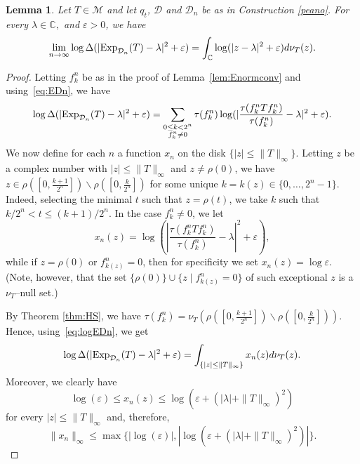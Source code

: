 \documentclass{amsart}
\theoremstyle{plain}
\newtheorem{lem}[thm]{Lemma}
\theoremstyle{remark}
\begin{document}
\begin{lem}\label{det convergence} Let $T\in\mathcal{M}$ and let $q_t$,  $\mathcal{D}$ and $\mathcal{D}_n$ be as in Construction \ref{peano}. For every $\lambda\in\mathbb{C},$ and $\varepsilon>0$, we have
\begin{equation}\label{eq:det convergence}
\lim_{n\to\infty}\log\Delta(|{\rm Exp}_{\mathcal{D}_n}(T)-\lambda|^2+\varepsilon)=\int_{\mathbb{C}}\log(|z-\lambda|^2+\varepsilon)d\nu_T(z).
\end{equation}
\end{lem}
\begin{proof} Letting $f^n_k$ be as in the proof of Lemma~\ref{lem:Enormconv} and using~\eqref{eq:EDn}, we have
\begin{equation}\label{eq:logEDn}
\log\Delta(|{\rm Exp}_{\mathcal{D}_n}(T)-\lambda|^2+\varepsilon)=\sum_{\substack{0\le k<2^n \\ f^n_k\ne0}}\tau(f^n_k)\log(|\frac{\tau(f^n_kTf^n_k)}{\tau(f^n_k)}-\lambda|^2+\varepsilon).
\end{equation}
We now define for each $n$ a function $x_n$ on the disk $\{|z|\le\|T\|_\infty\}$.
Letting $z$ be a complex number with 
$|z|\le\|T\|_\infty$ and $z\ne\rho(0)$, we have
$z\in\rho([0,\frac{k+1}{2^n}])\backslash \rho([0,\frac{k}{2^n}])$ for some unique $k=k(z)\in\{0,\ldots,2^n-1\}$.
Indeed, selecting the minimal $t$ such that $z=\rho(t)$, we take $k$ such that $k/2^n<t\leq(k+1)/2^n$.
In the case $f^n_k\ne0$, we let
\begin{equation}\label{xn def}
x_n(z)=\log(|\frac{\tau(f^n_kTf^n_k)}{\tau(f^n_k)}-\lambda|^2+\varepsilon), %
\end{equation}
while if $z=\rho(0)$ or $f^n_{k(z)}=0$, then for specificity we set $x_n(z)=\log\varepsilon$.
(Note, however, that the set $\{\rho(0)\}\cup\{z\mid f^n_{k(z)}=0\}$ of such exceptional $z$ is a $\nu_T$--null set.)

By Theorem \ref{thm:HS}, we have $\tau(f^n_k)=\nu_T(\rho([0,\frac{k+1}{2^n}])\backslash \rho([0,\frac{k}{2^n}])).$ Hence,
using~\eqref{eq:logEDn}, we get
\begin{equation}\label{tttkkk}
\log\Delta(|{\rm Exp}_{\mathcal{D}_n}(T)-\lambda|^2+\varepsilon)=\int_{\{|z|\leq\|T\|_{\infty}\}}x_n(z)d\nu_T(z).
\end{equation}
Moreover, we clearly have
$$\log(\varepsilon)\leq x_n(z)\leq \log(\varepsilon+(|\lambda|+\|T\|_{\infty})^2) $$
for every $|z|\le\|T\|_\infty$
and, therefore,
$$\|x_n\|_{\infty}\leq\max\{|\log(\varepsilon)|,|\log(\varepsilon+(|\lambda|+\|T\|_{\infty})^2)|\}.$$


\end{proof}
\end{document}
